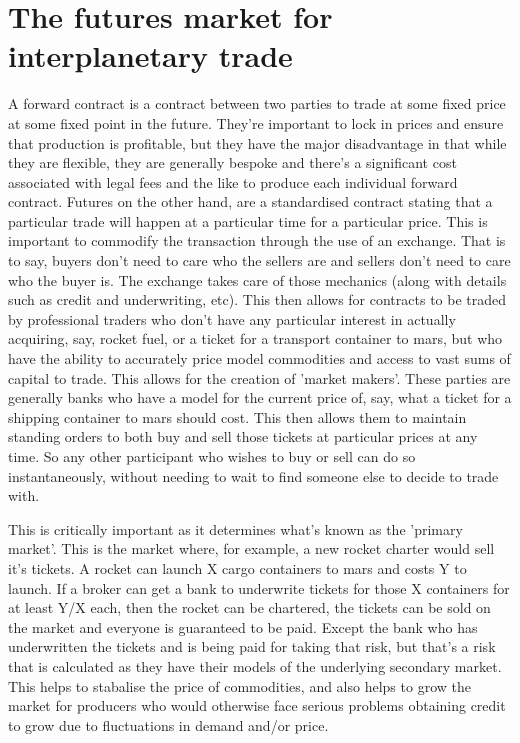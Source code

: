 \documentclass[10pt]{article}
\begin{document}
\section{The futures market for interplanetary trade}

A forward contract is a contract between two parties to trade at some fixed price at some fixed point in the future. They're important to lock in prices and ensure that production is profitable, but they have the major disadvantage in that while they are flexible, they are generally bespoke and there's a significant cost associated with legal fees and the like to produce each individual forward contract. Futures on the other hand, are a standardised contract stating that a particular trade will happen at a particular time for a particular price. This is important to commodify the transaction through the use of an exchange. That is to say, buyers don't need to care who the sellers are and sellers don't need to care who the buyer is. The exchange takes care of those mechanics (along with details such as credit and underwriting, etc). This then allows for contracts to be traded by professional traders who don't have any particular interest in actually acquiring, say, rocket fuel, or a ticket for a transport container to mars, but who have the ability to accurately price model commodities and access to vast sums of capital to trade. This allows for the creation of 'market makers'. These parties are generally banks who have a model for the current price of, say, what a ticket for a shipping container to mars should cost. This then allows them to maintain standing orders to both buy and sell those tickets at particular prices at any time. So any other participant who wishes to buy or sell can do so instantaneously, without needing to wait to find someone else to decide to trade with.

This is critically important as it determines what's known as the 'primary market'. This is the market where, for example, a new rocket charter would sell it's tickets. A rocket can launch X cargo containers to mars and costs Y to launch. If a broker can get a bank to underwrite tickets for those X containers for at least Y/X each, then the rocket can be chartered, the tickets can be sold on the market and everyone is guaranteed to be paid. Except the bank who has underwritten the tickets and is being paid for taking that risk, but that's a risk that is calculated as they have their models of the underlying secondary market. This helps to stabalise the price of commodities, and also helps to grow the market for producers who would otherwise face serious problems obtaining credit to grow due to fluctuations in demand and/or price.
\end{document}
